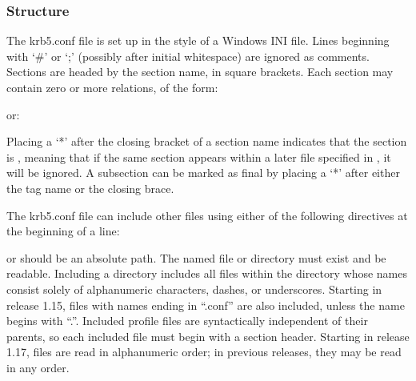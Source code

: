 \documentclass[letterpaper,10pt,english]{sphinxmanual}
\begin{document}
\subsubsection{Structure}
\label{\detokenize{admin/conf_files/krb5_conf:structure}}
The krb5.conf file is set up in the style of a Windows INI file.
Lines beginning with ‘\#’ or ‘;’ (possibly after initial whitespace)
are ignored as comments.  Sections are headed by the section name, in
square brackets.  Each section may contain zero or more relations, of
the form:

%
\begin{sphinxVerbatim}[commandchars=\\\{\}]
  
\end{sphinxVerbatim}

or:

%
\begin{sphinxVerbatim}[commandchars=\\\{\}]
  
      
      
\end{sphinxVerbatim}

Placing a ‘*’ after the closing bracket of a section name indicates
that the section is , meaning that if the same section appears
within a later file specified in , it will be ignored.
A subsection can be marked as final by placing a ‘*’ after either the
tag name or the closing brace.

The krb5.conf file can include other files using either of the
following directives at the beginning of a line:

%
\begin{sphinxVerbatim}[commandchars=\\\{\}]
 
 
\end{sphinxVerbatim}

 or  should be an absolute path. The named file or
directory must exist and be readable.  Including a directory includes
all files within the directory whose names consist solely of
alphanumeric characters, dashes, or underscores.  Starting in release
1.15, files with names ending in “.conf” are also included, unless the
name begins with “.”.  Included profile files are syntactically
independent of their parents, so each included file must begin with a
section header.  Starting in release 1.17, files are read in
alphanumeric order; in previous releases, they may be read in any
order.
\end{document}
